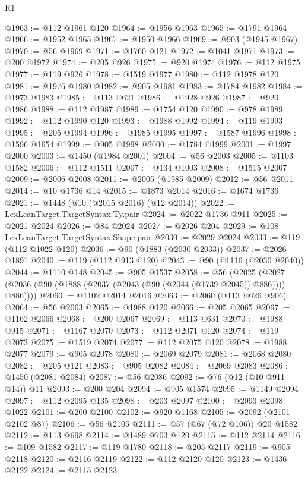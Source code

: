\begin{lexlean}{R1}
\begin{coremodule}
@1963 := @112 @1961 @120
@1964 := @1956 @1963
@1965 := @1791 @1964
@1966 := @1952 @1965
@1967 := @1950 @1966
@1969 := @903 (@1945 @1967)
@1970 := @56 @1969
@1971 := @1760 @121
@1972 := @1041 @1971
@1973 := @200 @1972
@1974 := @205 @926
@1975 := @920 @1974
@1976 := @112 @1975
@1977 := @119 @926
@1978 := @1519 @1977
@1980 := @112 @1978 @120
@1981 := @1976 @1980
@1982 := @905 @1981
@1983 := @1784 @1982
@1984 := @1973 @1983
@1985 := @113 @621
@1986 := @1928 @926
@1987 := @920 @1986
@1988 := @112 @1987
@1989 := @1754 @120
@1990 := @978 @1989
@1992 := @112 @1990 @120
@1993 := @1988 @1992
@1994 := @119 @1993
@1995 := @205 @1994
@1996 := @1985 @1995
@1997 := @1587 @1996
@1998 := @1596 @1654
@1999 := @905 @1998
@2000 := @1784 @1999
@2001 := @1997 @2000
@2003 := @1450 (@1984 @2001)
@2004 := @56 @2003
@2005 := @1103 @1582
@2006 := @112 @1511
@2007 := @134 @1003
@2008 := @1515 @2007
@2009 := @2006 @2008
@2011 := @2005 (@1985 @2009)
@2012 := @56 @2011
@2014 := @10 @1736 @14
@2015 := @1873 @2014
@2016 := @1674 @1736
@2021 := @1448 (@10 (@2015 @2016) (@12 @2014))
@2022 := LexLeanTarget.TargetSyntax.Ty.pair
@2024 := @2022 @1736 @911
@2025 := @2021 @2024
@2026 := @84 @2024
@2027 := @2026 @204
@2029 := @108 LexLeanTarget.TargetSyntax.Shape.pair
@2030 := @2029 @2024
@2033 := @119 (@112 @1022 @120)
@2036 := @90 (@1883 (@2030 @2033))
@2037 := @2026 @1891
@2040 := @119 (@112 @913 @120)
@2043 := @90 (@1116 (@2030 @2040))
@2044 := @1110 @148
@2045 := @905 @1537
@2058 := @56
    (@2025 (@2027 (@2036 (@90 (@1888 (@2037 (@2043 (@90 (@2044 (@1739 @2045)) @886)))) @886))))
@2060 := @1102 @2014 @2016
@2063 := @2060 (@113 @626 @906)
@2064 := @56 @2063
@2065 := @1988 @120
@2066 := @205 @2065
@2067 := @1162 @2066
@2068 := @200 @2067
@2069 := @113 @631
@2070 := @1988 @915
@2071 := @1167 @2070
@2073 := @112 @2071 @120
@2074 := @119 @2073
@2075 := @1519 @2074
@2077 := @112 @2075 @120
@2078 := @1988 @2077
@2079 := @905 @2078
@2080 := @2069 @2079
@2081 := @2068 @2080
@2082 := @205 @121
@2083 := @905 @2082
@2084 := @2069 @2083
@2086 := @1450 (@2081 @2084)
@2087 := @56 @2086
@2092 := @76 (@12 (@10 @911 @14)) @11
@2093 := @200 @204
@2094 := @905 @1574
@2095 := @1149 @2094
@2097 := @112 @2095 @135
@2098 := @203 @2097
@2100 := @2093 @2098 @1022
@2101 := @200 @2100
@2102 := @920 @1168
@2105 := @2092 (@2101 @2102 @87)
@2106 := @56 @2105
@2111 := @57 (@67 (@72 @106)) @20 @1582
@2112 := @113 @698
@2114 := @1489 @703 @120
@2115 := @112 @2114
@2116 := @109 @1582
@2117 := @119 @1780
@2118 := @205 @2117
@2119 := @905 @2118
@2120 := @2116 @2119
@2122 := @112 @2120 @120
@2123 := @1436 @2122
@2124 := @2115 @2123

\end{coremodule}
\end{lexlean}
